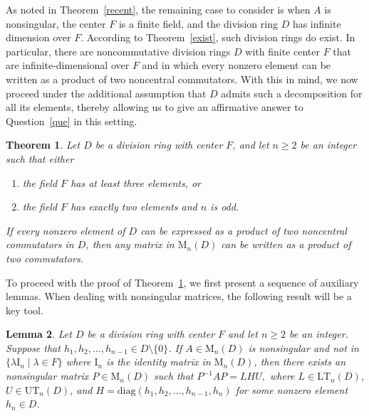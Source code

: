 \documentclass[11pt]{article}
\newtheorem{theorem}{Theorem}
\newtheorem{lemma}[theorem]{Lemma}
\theoremstyle{definition}
\begin{document}
{{{{				
				
				As noted in Theorem~\ref{recent}, the remaining case to consider is when \( A \) is nonsingular, the center \( F \) is a finite field, and the division ring \( D \) has infinite dimension over \( F \). According to Theorem~\ref{exist}, such division rings do exist. In particular, there are noncommutative division rings \( D \) with finite center $F$ that are infinite-dimensional over \( F \) and in which every nonzero element can be written as a product of two noncentral commutators. With this in mind, we now proceed under the additional assumption that \( D \) admits such a decomposition for all its elements, thereby allowing us to give an affirmative answer to Question~\ref{que} in this setting.
				
				
				\begin{theorem}\label{mainthm}
					Let $D$ be a division ring with center $F$, and let $n\geq 2$ be an integer such that either
					\begin{enumerate}[\rm (i)]
						\item  the field $F$ has at least three elements, or
						\item the field $F$ has exactly two elements  and $n$ is odd.
					\end{enumerate}		If  every nonzero element of $D$ can be expressed as a product of  two noncentral commutators in $D$, then any matrix in $\mathrm{M}_n(D)$ can be written as a product of two  commutators.
				\end{theorem}
	
				To proceed with the proof of Theorem~\ref{mainthm}, we first present a sequence of auxiliary lemmas. When dealing with nonsingular matrices, the following result will be a key tool.
				
				\begin{lemma} {\rm \cite[Lemma~2.1]{Egorchenkova}} \label{LHU}
					Let \( D \) be a division ring with center $F$ and let \( n\geq2 \) be an integer. Suppose that $h_1,h_2,\ldots,h_{n-1}\in D\setminus\{0\}$. If $A\in\mathrm{M}_n(D)$ is nonsingular and not in \( \{ \lambda \mathrm{I}_n \mid \lambda \in F \} \) where $\mathrm{I}_n$ is the identity matrix in $\mathrm{M}_n(D)$, then there exists an nonsingular matrix \( P \in \mathrm{M}_n(D) \) such that
					$P^{-1} A P = L H U,$
					where \( L \in \mathrm{LT}_n(D) \), \( U \in \mathrm{UT}_n(D) \), and \( H = \mathrm{diag}(h_1,h_2,\ldots,h_{n-1},h_n) \) for some nonzero element \( h_n \in D\).
				\end{lemma}
				
}}}}
\end{document}
